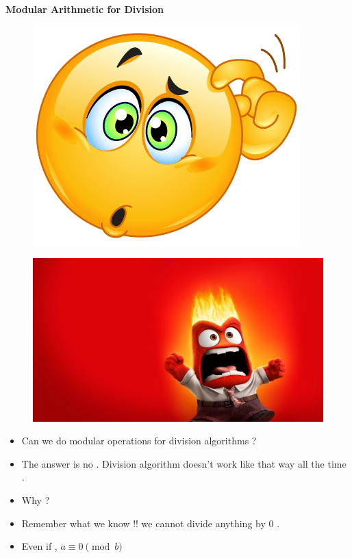 \documentclass{beamer}
\begin{document}
\begin{frame}{\textbf{Modular Arithmetic for Division}}
     {
    \begin{center}
        \begin{figure}
            \centering
            \includegraphics[scale = 0.3]{think.png}
        \end{figure}
    \end{center}}
    
     {
    \begin{center}
        \begin{figure}
            \centering
            \includegraphics [scale = 0.1]{anger1.jpg}
        \end{figure}
    \end{center}}
    \begin{center}
        \begin{itemize}
            \item <1-> Can we do modular operations for division algorithms ? 
            \item <2-> The answer is no . Division algorithm doesn't work like that way all the time .
            \item <3-> Why ?
            \item <4->Remember what we know !! we cannot divide anything by $0$ .
            \item <5->Even if , $a\equiv 0 \pmod b$
        \end{itemize}
    \end{center}
\end{frame}
\end{document}
